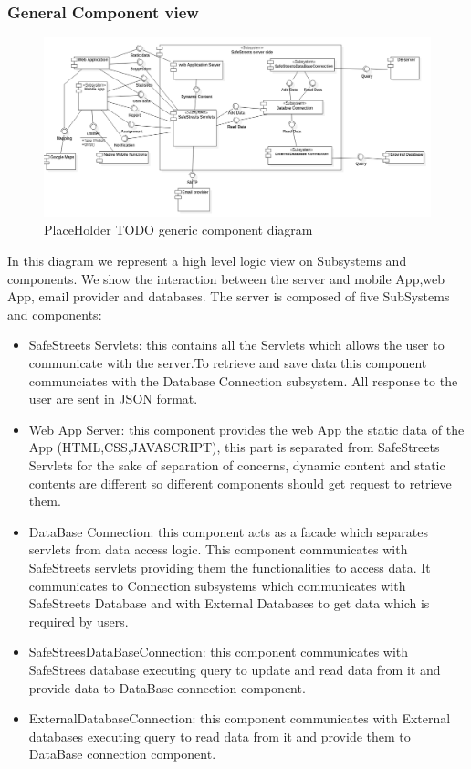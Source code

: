 \subsubsection{General Component view}
\begin{figure}[H]
\centering
\includegraphics[width=\textwidth]{Images/GenericComponentDiagram.png}
\caption{\label{fig:ComWI}PlaceHolder TODO generic component diagram}
\end{figure}
In this diagram we represent a high level logic view on Subsystems and components. We show the interaction between the server and mobile App,web App, email provider and databases.
The server is composed of five SubSystems and components:
\begin{itemize}
\item SafeStreets Servlets: this contains all the Servlets which allows the user to communicate with the server.To retrieve and save data this component communciates with the Database Connection subsystem. All response to the user are sent in JSON format. 
\item Web App Server: this component provides the web App the static data of the App (HTML,CSS,JAVASCRIPT), this part is separated from SafeStreets Servlets for the sake of separation of concerns, dynamic content and static contents are different so different components should get request to retrieve them.
\item DataBase Connection: this component acts as a facade which separates servlets from data access logic. This component communicates with SafeStreets servlets providing them the functionalities to access data.
It communicates to Connection subsystems which communicates with SafeStreets Database and with External Databases to get data which is required by users.
\item SafeStreesDataBaseConnection: this component communicates with SafeStrees database executing query to update and read data from it and provide data to DataBase connection component. 
\item ExternalDatabaseConnection: this component communicates with External databases executing query to read data from it and provide them to DataBase connection component.
\end{itemize}
